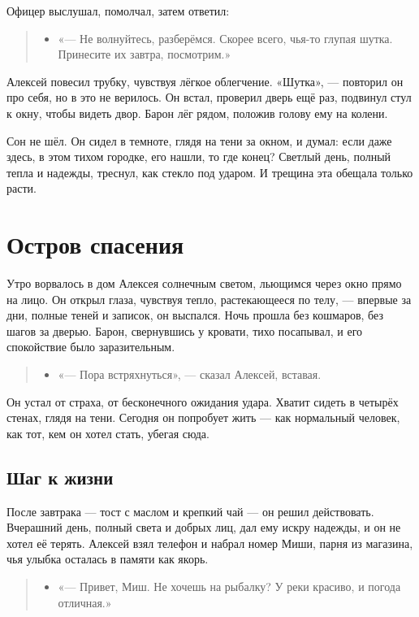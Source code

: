 \documentclass[12pt,a4paper]{book}
\newenvironment{dialogue}{\begin{quote}\itshape\begin{itemize}\item[]}{\end{itemize}\end{quote}}
\begin{document}
Офицер выслушал, помолчал, затем ответил:

\begin{dialogue}
«— Не волнуйтесь, разберёмся. Скорее всего, чья-то глупая шутка. Принесите их завтра, посмотрим.»
\end{dialogue}

Алексей повесил трубку, чувствуя лёгкое облегчение. «Шутка», — повторил он про себя, но в это не верилось. Он встал, проверил дверь ещё раз, подвинул стул к окну, чтобы видеть двор. Барон лёг рядом, положив голову ему на колени.

Сон не шёл. Он сидел в темноте, глядя на тени за окном, и думал: если даже здесь, в этом тихом городке, его нашли, то где конец? Светлый день, полный тепла и надежды, треснул, как стекло под ударом. И трещина эта обещала только расти.

\chapter{Остров спасения}

Утро ворвалось в дом Алексея солнечным светом, льющимся через окно прямо на лицо. Он открыл глаза, чувствуя тепло, растекающееся по телу, — впервые за дни, полные теней и записок, он выспался. Ночь прошла без кошмаров, без шагов за дверью. Барон, свернувшись у кровати, тихо посапывал, и его спокойствие было заразительным.

\begin{dialogue}
«— Пора встряхнуться», — сказал Алексей, вставая.
\end{dialogue}

Он устал от страха, от бесконечного ожидания удара. Хватит сидеть в четырёх стенах, глядя на тени. Сегодня он попробует жить — как нормальный человек, как тот, кем он хотел стать, убегая сюда.

\section{Шаг к жизни}

После завтрака — тост с маслом и крепкий чай — он решил действовать. Вчерашний день, полный света и добрых лиц, дал ему искру надежды, и он не хотел её терять. Алексей взял телефон и набрал номер Миши, парня из магазина, чья улыбка осталась в памяти как якорь.

\begin{dialogue}
«— Привет, Миш. Не хочешь на рыбалку? У реки красиво, и погода отличная.»
\end{dialogue}
\end{document}
